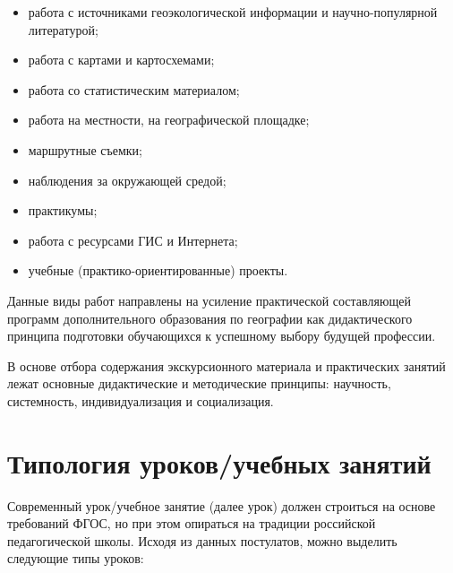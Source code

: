 \documentclass[
  11pt,
]{book}
\begin{document}
\begin{itemize}
\item
  работа с источниками геоэкологической информации и научно-популярной литературой;
\item
  работа с картами и картосхемами;
\item
  работа со статистическим материалом;
\item
  работа на местности, на географической площадке;
\item
  маршрутные съемки;
\item
  наблюдения за окружающей средой;
\item
  практикумы;
\item
  работа с ресурсами ГИС и Интернета;
\item
  учебные (практико-ориентированные) проекты.
\end{itemize}

Данные виды работ направлены на усиление практической составляющей программ дополнительного образования по географии как дидактического принципа подготовки обучающихся к успешному выбору будущей профессии.

В основе отбора содержания экскурсионного материала и практических занятий лежат основные дидактические и методические принципы: научность, системность, индивидуализация и социализация.

\section*{Типология уроков/учебных занятий}\label{ux442ux438ux43fux43eux43bux43eux433ux438ux44f-ux443ux440ux43eux43aux43eux432ux443ux447ux435ux431ux43dux44bux445-ux437ux430ux43dux44fux442ux438ux439}

Современный урок/учебное занятие (далее урок) должен строиться на основе требований ФГОС, но при этом опираться на традиции российской педагогической школы. Исходя из данных постулатов, можно выделить следующие типы уроков:
\end{document}
